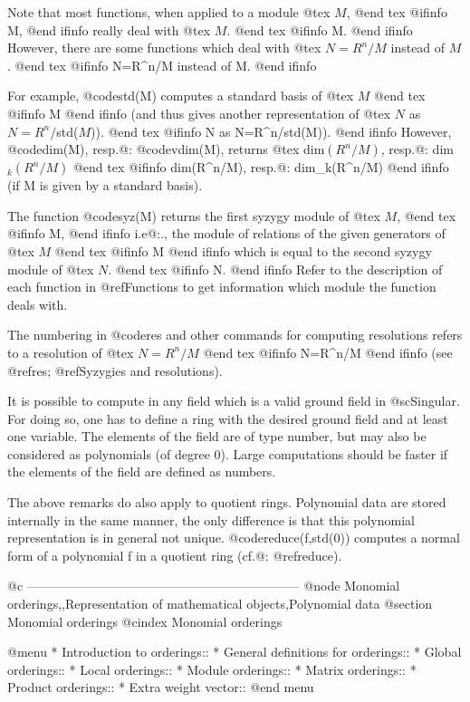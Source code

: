 Note that most functions, when applied to a module 
@tex
$M$,
@end tex
@ifinfo
M,
@end ifinfo
really deal with
@tex
$M$.
@end tex
@ifinfo
M.
@end ifinfo
However, there are some functions which deal with 
@tex
$N = R^n/M$ instead of $M$.
@end tex
@ifinfo
N=R^n/M instead of M.
@end ifinfo

For example, @code{std(M)} computes a standard basis of 
@tex
$M$
@end tex
@ifinfo
M
@end ifinfo
(and thus gives another representation of 
@tex
$N$ as $N = R^n/$std($M$)).
@end tex
@ifinfo
N as N=R^n/std(M)).
@end ifinfo
However, @code{dim(M)}, resp.@: @code{vdim(M)}, returns
@tex
dim$(R^n/M)$, resp.@: dim$_k(R^n/M)$
@end tex
@ifinfo
dim(R^n/M), resp.@: dim_k(R^n/M)
@end ifinfo
(if M is given by a standard basis).

The function @code{syz(M)}  returns the first syzygy module of 
@tex
$M$,
@end tex
@ifinfo
M,
@end ifinfo
i.e@:., the module 
of relations of the given generators of 
@tex
$M$
@end tex
@ifinfo
M
@end ifinfo
which is equal to the second syzygy module of 
@tex
$N$.
@end tex
@ifinfo
N.
@end ifinfo
Refer to the description of each function in
@ref{Functions} to get information which module the function deals with.

The numbering in @code{res} and other commands for computing resolutions
refers to a resolution of
@tex
$N = R^n/M$
@end tex
@ifinfo
N=R^n/M
@end ifinfo
(see @ref{res}; @ref{Syzygies and resolutions}).

It is possible to compute in any field which is a valid ground field in
@sc{Singular}.  For doing so, one has to define a ring with the desired
ground field and at least one variable. The elements of the field are of
type number, but may also be considered as polynomials (of degree
0). Large computations should be faster if the elements of the field are
defined as numbers.

The above remarks do also apply to quotient rings. Polynomial data are
stored internally in the same manner, the only difference is that this
polynomial representation is in general not unique. @code{reduce(f,std(0))}
computes a normal form of a polynomial f in a quotient ring (cf.@:
@ref{reduce}).

@c -----------------------------------------------------------------
@node Monomial orderings,,Representation of mathematical objects,Polynomial data
@section Monomial orderings
@cindex Monomial orderings

@menu
* Introduction to orderings::
* General definitions for orderings::
* Global orderings::
* Local orderings::
* Module orderings::
* Matrix orderings::
* Product orderings::
* Extra weight vector::
@end menu

